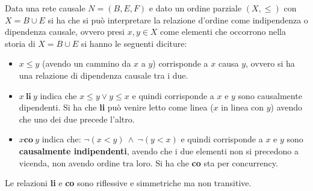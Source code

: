 \begin{definizione}
    Data una rete causale $N = (B,E, F)$ e dato un ordine parziale $(X, \leq)$
    con $X = B \cup E$ si ha che si può interpretare la relazione d'ordine come
    indipendenza o dipendenza causale, ovvero presi $x, y \in X$ come elementi
    che occorrono nella storia di $X = B \cup E$ si hanno le seguenti diciture:
    \begin{itemize}
        \item $x \leq y$ (avendo un cammino da $x$ a $y$) corrisponde a $x$ causa
              $y$, ovvero si ha una relazione di dipendenza causale tra i due.
        \item $x \ \textbf{li} \ y$ indica che $x \leq y \lor y \leq x$ e quindi
              corrisponde a $x$ e $y$ sono causalmente dipendenti. Si ha che \textbf{li}
              può venire letto come linea ($x$ in linea con $y$) avendo che uno dei
              due precede l'altro.
        \item $x \textbf{co} \ y$ indica che: $\lnot(x < y)\  \land  \ \lnot (y < x)$
              e quindi corrisponde a $x$ e $y$ sono \textbf{causalmente indipendenti},
              avendo che i due elementi non si precedono a vicenda, non avendo ordine
              tra loro. Si ha che \textbf{co} sta per concurrency.
    \end{itemize}
    Le relazioni \textbf{li} e \textbf{co} sono riflessive e simmetriche ma non transitive.
\end{definizione}
